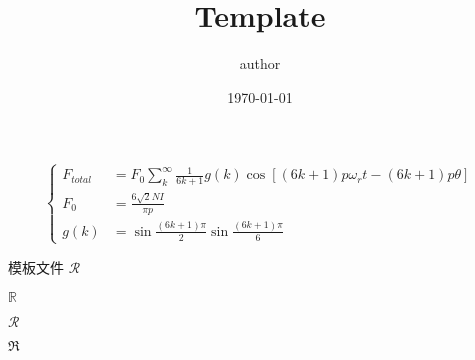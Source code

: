 \documentclass[UTF-8]{MyTemplate}
\begin{document}
\title{Template}
\author{author}
\date{\today}
\maketitle
% 


\begin{equation}
	\left\{
		\begin{aligned}
			\label{eq:demo}
			F_{total} &= F_0 \sum_{k}^{\infty} \frac{1}{6k+1} g(k) \cos[(6k+1)p\omega_r t -(6k+1)p\theta]\\
			F_0 &= \frac{6 \sqrt{2} N I}{\pi p}\\
			g(k) &= \sin \frac{(6k+1)\pi}{2} \sin \frac{(6k+1)\pi}{6}
		\end{aligned}
	\right.
\end{equation}

模板文件
$\mathcal{R}$

$\mathbb{R}$

$\mathscr{R}$

$\mathfrak{R}$

\newpage

\end{document}
